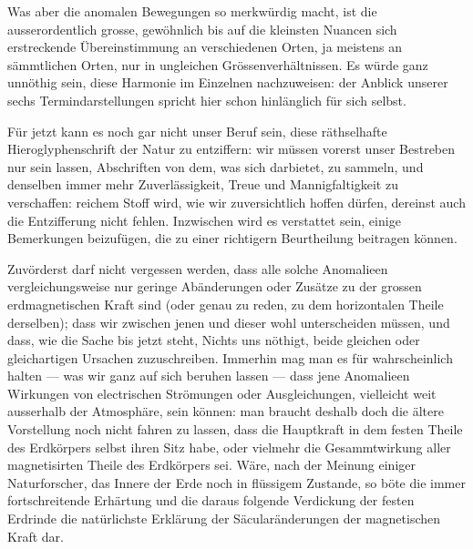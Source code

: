 Was aber die anomalen Bewegungen so merkwürdig macht, ist die ausserordentlich grosse, gewöhnlich bis auf die kleinsten Nuancen sich erstreckende Übereinstimmung an verschiedenen Orten, ja meistens an sämmtlichen Orten, nur in ungleichen Grössenverhältnissen. Es würde ganz unnöthig sein, diese Harmonie im Einzelnen nachzuweisen: der Anblick unserer sechs Termindarstellungen spricht hier schon hinlänglich für sich selbst.

\par
\clearpage
{}
Für jetzt kann es noch gar nicht unser Beruf sein, diese räthselhafte Hieroglyphenschrift der Natur zu entziffern: wir müssen vorerst unser Bestreben nur sein lassen, Abschriften von dem, was sich darbietet, zu sammeln, und denselben immer mehr Zuverlässigkeit, Treue und Mannigfaltigkeit zu verschaffen: reichem Stoff wird, wie wir zuversichtlich hoffen dürfen, dereinst auch die Entzifferung nicht fehlen. Inzwischen wird es verstattet sein, einige Bemerkungen beizufügen, die zu einer richtigern Beurtheilung beitragen können.

Zuvörderst darf nicht vergessen werden, dass alle solche Anomalieen vergleichungsweise nur geringe Abänderungen oder Zusätze zu der grossen erdmagnetischen Kraft sind (oder genau zu reden, zu dem horizontalen Theile derselben); dass wir zwischen jenen und dieser wohl unterscheiden müssen, und dass, wie die Sache bis jetzt steht, Nichts uns nöthigt, beide gleichen oder gleichartigen Ursachen zuzuschreiben. Immerhin mag man es für wahrscheinlich halten --- was wir ganz auf sich beruhen lassen --- dass jene Anomalieen Wirkungen von electrischen Strömungen oder Ausgleichungen, vielleicht weit ausserhalb der Atmosphäre, sein können: man braucht deshalb doch die ältere Vorstellung noch nicht fahren zu lassen, dass die Hauptkraft in dem festen Theile des Erdkörpers selbst ihren Sitz habe, oder vielmehr die Gesammtwirkung aller magnetisirten Theile des Erdkörpers sei. Wäre, nach der Meinung einiger Naturforscher, das Innere der Erde noch in flüssigem Zustande, so böte die immer fortschreitende Erhärtung und die daraus folgende Verdickung der festen Erdrinde die natürlichste Erklärung der Säcularänderungen der magnetischen Kraft dar.

